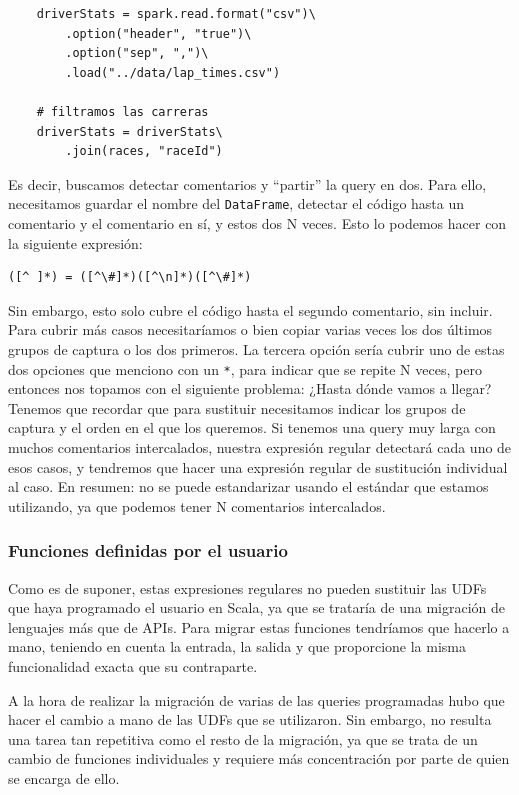 \documentclass[12pt,twoside,titlepage]{report}
\newcommand{\quotes}[1]{``#1''}
\begin{document}
\begin{lstlisting}
	driverStats = spark.read.format("csv")\
		.option("header", "true")\
		.option("sep", ",")\
		.load("../data/lap_times.csv")
	
	# filtramos las carreras
	driverStats = driverStats\
		.join(races, "raceId")
\end{lstlisting}

Es decir, buscamos detectar comentarios y \quotes{partir} la query en dos. Para ello, necesitamos guardar el nombre del \texttt{DataFrame}, detectar el código hasta un comentario y el comentario en sí, y estos dos N veces. Esto lo podemos hacer con la siguiente expresión:

\begin{lstlisting}
([^ ]*) = ([^\#]*)([^\n]*)([^\#]*)
\end{lstlisting}

Sin embargo, esto solo cubre el código hasta el segundo comentario, sin incluir. Para cubrir más casos necesitaríamos o bien copiar varias veces los dos últimos grupos de captura o los dos primeros. La tercera opción sería cubrir uno de estas dos opciones que menciono con un \texttt{*}, para indicar que se repite N veces, pero entonces nos topamos con el siguiente problema: ¿Hasta dónde vamos a llegar? Tenemos que recordar que para sustituir necesitamos indicar los grupos de captura y el orden en el que los queremos. Si tenemos una query muy larga con muchos comentarios intercalados, nuestra expresión regular detectará cada uno de esos casos, y tendremos que hacer una expresión regular de sustitución individual al caso. En resumen: no se puede estandarizar usando el estándar que estamos utilizando, ya que podemos tener N comentarios intercalados.

\subsubsection{Funciones definidas por el usuario}

Como es de suponer, estas expresiones regulares no pueden sustituir las UDFs que haya programado el usuario en Scala, ya que se trataría de una migración de lenguajes más que de APIs. Para migrar estas funciones tendríamos que hacerlo a mano, teniendo en cuenta la entrada, la salida y que proporcione la misma funcionalidad exacta que su contraparte. 

A la hora de realizar la migración de varias de las queries programadas hubo que hacer el cambio a mano de las UDFs que se utilizaron. Sin embargo, no resulta una tarea tan repetitiva como el resto de la migración, ya que se trata de un cambio de funciones individuales y requiere más concentración por parte de quien se encarga de ello.
\end{document}
